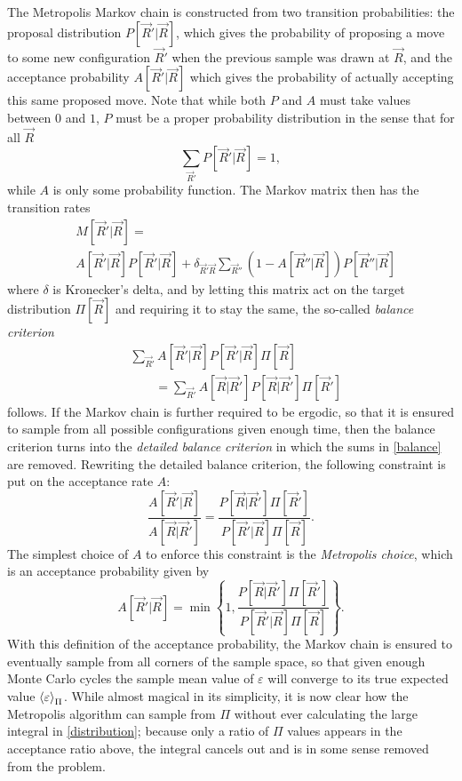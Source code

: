 \documentclass[a4paper,8pt]{article}
\begin{document}
\begin{multicols}{2}
The Metropolis Markov chain is constructed from two transition probabilities: the proposal distribution $P[\vec{R}'|\vec{R}]$, which gives the probability of proposing a move to some new configuration $\vec{R}'$ when the previous sample was drawn at $\vec{R}$, and the acceptance probability $A[\vec{R}'|\vec{R}]$ which gives the probability of actually accepting this same proposed move. Note that while both $P$ and $A$ must take values between $0$ and $1$, $P$ must be a proper probability distribution in the sense that for all $\vec{R}$
\begin{equation}\label{propdistcint}
\sum\limits_{\vec{R}'} P[\vec{R}'|\vec{R}] = 1,
\end{equation}
while $A$ is only some probability function. The Markov matrix then has the transition rates
\begin{align}
&M[\vec{R}'|\vec{R}] = \nonumber\\
&A[\vec{R}'|\vec{R}]P[\vec{R}'|\vec{R}] + \delta_{\vec{R}'\vec{R}}\sum\limits_{\vec{R}''} \left(1-A[\vec{R}''|\vec{R}]\right)P[\vec{R}''|\vec{R}]
\end{align}
where $\delta$ is Kronecker's delta, and by letting this matrix act on the target distribution $\Pi[\vec{R}]$ and requiring it to stay the same, the so-called \textit{balance criterion} 
\begin{align}\label{balance}
&\sum\limits_{\vec{R}'} A[\vec{R}'|\vec{R}]P[\vec{R}'|\vec{R}]\Pi[\vec{R}] \nonumber\\
&\qquad = \sum\limits_{\vec{R}'} A[\vec{R}|\vec{R}']P[\vec{R}|\vec{R}']\Pi[\vec{R}']  
\end{align}
follows. If the Markov chain is further required to be ergodic, so that it is ensured to sample from all possible configurations given enough time, then the balance criterion turns into the \textit{detailed balance criterion} in which the sums in \eqref{balance} are removed. Rewriting the detailed balance criterion, the following constraint is put on the acceptance rate $A$:
\begin{equation}\label{accprobcint}
\frac{A[\vec{R}'|\vec{R}]}{A[\vec{R}|\vec{R}']} = \frac{P[\vec{R}|\vec{R}']\Pi[\vec{R}']}{P[\vec{R}'|\vec{R}]\Pi[\vec{R}]}.
\end{equation}
The simplest choice of $A$ to enforce this constraint is the \textit{Metropolis choice}, which is an acceptance probability given by
\begin{equation}\label{accprob}
A[\vec{R}'|\vec{R}] = \min\left\{1,\frac{P[\vec{R}|\vec{R}']\Pi[\vec{R}']}{P[\vec{R}'|\vec{R}]\Pi[\vec{R}]}\right\}.
\end{equation}
With this definition of the acceptance probability, the Markov chain is ensured to eventually sample from all corners of the sample space, so that given enough Monte Carlo cycles the sample mean value of $\varepsilon$ will converge to its true expected value $\ev{\varepsilon}_\Pi$. While almost magical in its simplicity, it is now clear how the Metropolis algorithm can sample from $\Pi$ without ever calculating the large integral in \eqref{distribution}; because only a ratio of $\Pi$ values appears in the acceptance ratio above, the integral cancels out and is in some sense removed from the problem.


\end{multicols}
\end{document}
